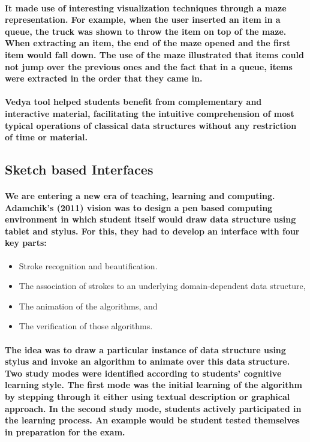 \documentclass{article}
\begin{document}
\paragraph{It made use of interesting visualization techniques through a maze representation. For example, when the user inserted an item in a queue, the truck was shown to throw the item on top of the maze. When extracting an item, the end of the maze opened and the first item would fall down. The use of the maze illustrated that items could not jump over the previous ones and the fact that in a queue, items were extracted in the order that they came in. }
\paragraph{\cite{patel2014literature}Vedya tool helped students benefit from complementary and interactive material, facilitating the intuitive comprehension of most typical operations of classical data structures without any restriction of time or material.}

\subsection{ Sketch based Interfaces}
\paragraph{ We are entering a new era of teaching, learning and computing. Adamchik's (2011)\cite{hammond2015impact} vision was to design a pen based computing environment in which student itself would draw data structure using tablet and stylus. For this, they had to develop an interface with four key parts: }
 \begin{itemize}
 \item Stroke recognition and beautification.
 \item The association of strokes to an underlying domain-dependent data structure,
 \item The animation of the algorithms, and 
 \item The verification of those algorithms.
 
\end{itemize}
 \paragraph{The idea was to draw a particular instance of data structure using stylus and invoke an algorithm to animate over this data structure. Two study modes were identified according to students' cognitive learning style. The first mode was the initial learning of the algorithm by stepping through it either using textual description or graphical approach. In the second study mode, students actively participated in the learning process. An example would be student tested themselves in preparation for the exam. }
\end{document}

